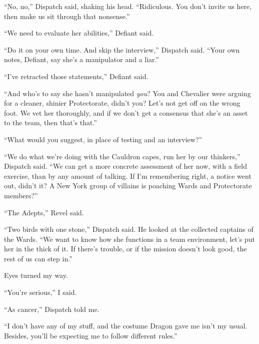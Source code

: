 ``No, no,'' Dispatch said, shaking his head.  ``Ridiculous.  You don't invite us here, then make us sit through that nonsense.''



``We need to evaluate her abilities,'' Defiant said.



``Do it on your own time.  And skip the interview,'' Dispatch said.  ``Your own notes, Defiant, say she's a manipulator and a liar.''



``I've retracted those statements,'' Defiant said.



``And who's to say she hasn't manipulated \emph{you}?  You and Chevalier were arguing for a cleaner, shinier Protectorate, didn't you?  Let's not get off on the wrong foot.  We vet her thoroughly, and if we don't get a consensus that she's an asset to the team, then that's that.''



``What would you suggest, in place of testing and an interview?''



``We do what we're doing with the Cauldron capes, run her by our thinkers,'' Dispatch said.  ``We can get a more concrete assessment of her now, with a field exercise, than by any amount of talking.  If I'm remembering right, a notice went out, didn't it?  A New York group of villains is poaching Wards and Protectorate members?''



``The Adepts,'' Revel said.



``Two birds with one stone,'' Dispatch said.  He looked at the collected captains of the Wards.  ``We want to know how she functions in a team environment, let's put her in the thick of it.  If there's trouble, or if the mission doesn't look good, the rest of us can step in.''



Eyes turned my way.



``You're serious,'' I said.



``As cancer,'' Dispatch told me.



``I don't have any of my stuff, and the costume Dragon gave me isn't my usual.  Besides, you'll be expecting me to follow different rules.''



